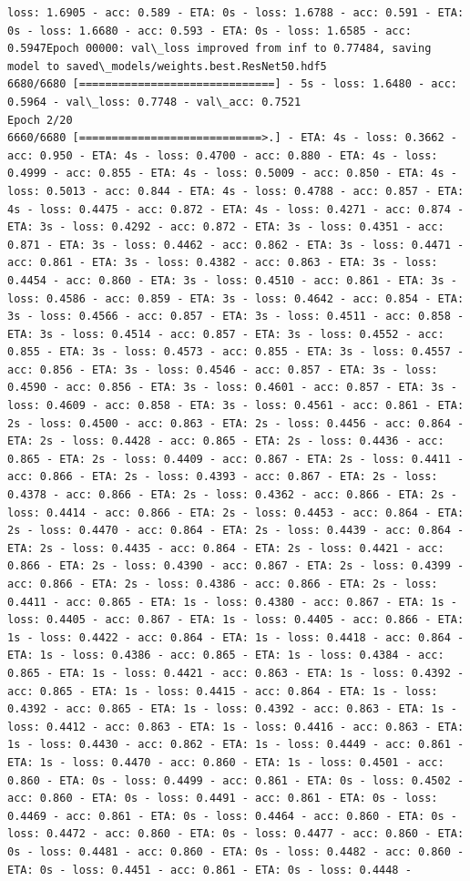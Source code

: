 \documentclass[11pt]{article}
\begin{document}
\begin{Verbatim}[commandchars=\\\{\}]
loss: 1.6905 - acc: 0.589 - ETA: 0s - loss: 1.6788 - acc: 0.591 - ETA: 0s - loss: 1.6680 - acc: 0.593 - ETA: 0s - loss: 1.6585 - acc: 0.5947Epoch 00000: val\_loss improved from inf to 0.77484, saving model to saved\_models/weights.best.ResNet50.hdf5
6680/6680 [==============================] - 5s - loss: 1.6480 - acc: 0.5964 - val\_loss: 0.7748 - val\_acc: 0.7521
Epoch 2/20
6660/6680 [============================>.] - ETA: 4s - loss: 0.3662 - acc: 0.950 - ETA: 4s - loss: 0.4700 - acc: 0.880 - ETA: 4s - loss: 0.4999 - acc: 0.855 - ETA: 4s - loss: 0.5009 - acc: 0.850 - ETA: 4s - loss: 0.5013 - acc: 0.844 - ETA: 4s - loss: 0.4788 - acc: 0.857 - ETA: 4s - loss: 0.4475 - acc: 0.872 - ETA: 4s - loss: 0.4271 - acc: 0.874 - ETA: 3s - loss: 0.4292 - acc: 0.872 - ETA: 3s - loss: 0.4351 - acc: 0.871 - ETA: 3s - loss: 0.4462 - acc: 0.862 - ETA: 3s - loss: 0.4471 - acc: 0.861 - ETA: 3s - loss: 0.4382 - acc: 0.863 - ETA: 3s - loss: 0.4454 - acc: 0.860 - ETA: 3s - loss: 0.4510 - acc: 0.861 - ETA: 3s - loss: 0.4586 - acc: 0.859 - ETA: 3s - loss: 0.4642 - acc: 0.854 - ETA: 3s - loss: 0.4566 - acc: 0.857 - ETA: 3s - loss: 0.4511 - acc: 0.858 - ETA: 3s - loss: 0.4514 - acc: 0.857 - ETA: 3s - loss: 0.4552 - acc: 0.855 - ETA: 3s - loss: 0.4573 - acc: 0.855 - ETA: 3s - loss: 0.4557 - acc: 0.856 - ETA: 3s - loss: 0.4546 - acc: 0.857 - ETA: 3s - loss: 0.4590 - acc: 0.856 - ETA: 3s - loss: 0.4601 - acc: 0.857 - ETA: 3s - loss: 0.4609 - acc: 0.858 - ETA: 3s - loss: 0.4561 - acc: 0.861 - ETA: 2s - loss: 0.4500 - acc: 0.863 - ETA: 2s - loss: 0.4456 - acc: 0.864 - ETA: 2s - loss: 0.4428 - acc: 0.865 - ETA: 2s - loss: 0.4436 - acc: 0.865 - ETA: 2s - loss: 0.4409 - acc: 0.867 - ETA: 2s - loss: 0.4411 - acc: 0.866 - ETA: 2s - loss: 0.4393 - acc: 0.867 - ETA: 2s - loss: 0.4378 - acc: 0.866 - ETA: 2s - loss: 0.4362 - acc: 0.866 - ETA: 2s - loss: 0.4414 - acc: 0.866 - ETA: 2s - loss: 0.4453 - acc: 0.864 - ETA: 2s - loss: 0.4470 - acc: 0.864 - ETA: 2s - loss: 0.4439 - acc: 0.864 - ETA: 2s - loss: 0.4435 - acc: 0.864 - ETA: 2s - loss: 0.4421 - acc: 0.866 - ETA: 2s - loss: 0.4390 - acc: 0.867 - ETA: 2s - loss: 0.4399 - acc: 0.866 - ETA: 2s - loss: 0.4386 - acc: 0.866 - ETA: 2s - loss: 0.4411 - acc: 0.865 - ETA: 1s - loss: 0.4380 - acc: 0.867 - ETA: 1s - loss: 0.4405 - acc: 0.867 - ETA: 1s - loss: 0.4405 - acc: 0.866 - ETA: 1s - loss: 0.4422 - acc: 0.864 - ETA: 1s - loss: 0.4418 - acc: 0.864 - ETA: 1s - loss: 0.4386 - acc: 0.865 - ETA: 1s - loss: 0.4384 - acc: 0.865 - ETA: 1s - loss: 0.4421 - acc: 0.863 - ETA: 1s - loss: 0.4392 - acc: 0.865 - ETA: 1s - loss: 0.4415 - acc: 0.864 - ETA: 1s - loss: 0.4392 - acc: 0.865 - ETA: 1s - loss: 0.4392 - acc: 0.863 - ETA: 1s - loss: 0.4412 - acc: 0.863 - ETA: 1s - loss: 0.4416 - acc: 0.863 - ETA: 1s - loss: 0.4430 - acc: 0.862 - ETA: 1s - loss: 0.4449 - acc: 0.861 - ETA: 1s - loss: 0.4470 - acc: 0.860 - ETA: 1s - loss: 0.4501 - acc: 0.860 - ETA: 0s - loss: 0.4499 - acc: 0.861 - ETA: 0s - loss: 0.4502 - acc: 0.860 - ETA: 0s - loss: 0.4491 - acc: 0.861 - ETA: 0s - loss: 0.4469 - acc: 0.861 - ETA: 0s - loss: 0.4464 - acc: 0.860 - ETA: 0s - loss: 0.4472 - acc: 0.860 - ETA: 0s - loss: 0.4477 - acc: 0.860 - ETA: 0s - loss: 0.4481 - acc: 0.860 - ETA: 0s - loss: 0.4482 - acc: 0.860 - ETA: 0s - loss: 0.4451 - acc: 0.861 - ETA: 0s - loss: 0.4448 - 
\end{Verbatim}
\end{document}
